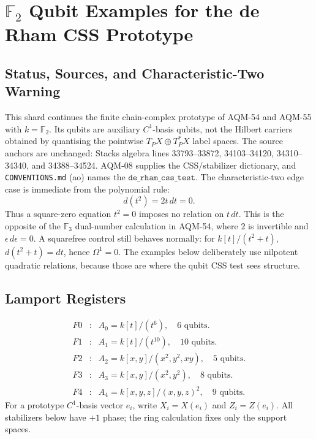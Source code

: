 \section{\texorpdfstring{\(\mathbb F_2\)}{F2} Qubit Examples for the de Rham CSS Prototype}
\label{sec:derham-css-f2-qubit-examples}
\subsection{Status, Sources, and Characteristic-Two Warning}
This shard continues the finite chain-complex prototype of AQM-54 and AQM-55
with \(k=\mathbb F_2\).  Its qubits are auxiliary \(C^1\)-basis qubits, not
the Hilbert carriers obtained by quantising the pointwise
\(T_PX\oplus T_P^*X\) label spaces.  The source anchors are unchanged: Stacks
algebra lines 33793--33872, 34103--34120, 34310--34340, and 34388--34524.
AQM-08 supplies the CSS/stabilizer dictionary, and \texttt{CONVENTIONS.md} (ao)
names the \(\texttt{de\_rham\_css\_test}\).
The characteristic-two edge case is immediate from the polynomial rule:
\[
  d(t^2)=2t\,dt=0.
\]
Thus a square-zero equation \(t^2=0\) imposes no relation on \(t\,dt\).  This
is the opposite of the \(\mathbb F_3\) dual-number calculation in AQM-54,
where \(2\) is invertible and \(\epsilon\,d\epsilon=0\).  A squarefree control
still behaves normally: for \(k[t]/(t^2+t)\), \(d(t^2+t)=dt\), hence
\(\Omega^1=0\).  The examples below deliberately use nilpotent quadratic
relations, because those are where the qubit CSS test sees structure.
\subsection{Lamport Registers}
\[
\begin{array}{rcl}
F0&:&A_0=k[t]/(t^6),\quad 6\text{ qubits}.\\
F1&:&A_1=k[t]/(t^{10}),\quad 10\text{ qubits}.\\
F2&:&A_2=k[x,y]/(x^2,y^2,xy),\quad 5\text{ qubits}.\\
F3&:&A_3=k[x,y]/(x^2,y^2),\quad 8\text{ qubits}.\\
F4&:&A_4=k[x,y,z]/(x,y,z)^2,\quad 9\text{ qubits}.
\end{array}
\]
For a prototype \(C^1\)-basis vector \(e_i\), write \(X_i=X(e_i)\) and
\(Z_i=Z(e_i)\).  All stabilizers below have \(+1\) phase; the ring calculation
fixes only the support spaces.
